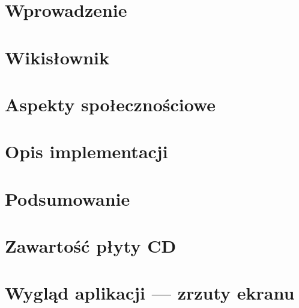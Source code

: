 

\chapter{Wprowadzenie}


\chapter{Wikisłownik}


\chapter{Aspekty społecznościowe}


\chapter{Opis implementacji}


\chapter{Podsumowanie}


\appendix
\chapter{Zawartość płyty CD}


\chapter{Wygląd aplikacji --- zrzuty ekranu}



